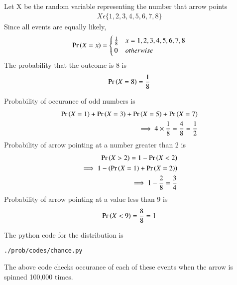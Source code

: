 Let X be the random variable representing the number that arrow points
\begin{align}
X \epsilon \{1,2,3,4,5,6,7,8\}
\end{align}
Since all events are equally likely,
\begin{align}
\Pr\left(X=x\right)=\begin{cases}
	\frac{1}{8}& x=1,2,3,4,5,6,7,8\\
	0 & otherwise
	\end{cases}
\end{align}
The probability that the outcome is 8 is 
\begin{align}
\Pr\left(X=8\right) = \frac{1}{8}
\end{align}

Probability of occurance of odd numbers is
\begin{align}
\Pr\left(X=1\right)+\Pr\left(X=3\right)+\Pr\left(X=5\right)+\Pr\left(X=7\right)
 \\
\implies 4 \times \frac{1}{8}=\frac{4}{8}=\frac{1}{2}
\end{align}
Probability of arrow pointing at a number greater than 2 is
\begin{align}
\Pr\left(X > 2\right)=1 -\Pr\left(X < 2\right) 
\\
\implies 1-\left(\Pr\left(X=1\right)+\Pr\left(X=2\right)\right)
\\
\implies 1-\frac{2}{8}=\frac{3}{4}
\end{align}
  Probability of arrow pointing at a value less than 9 is
\begin{align}
\Pr\left(X < 9\right) =\frac{8}{8}=1
\end{align}

The python code for the distribution is
\begin{lstlisting}
./prob/codes/chance.py
\end{lstlisting}
The above code checks occurance of each of these events when the arrow is spinned 100,000 times.
